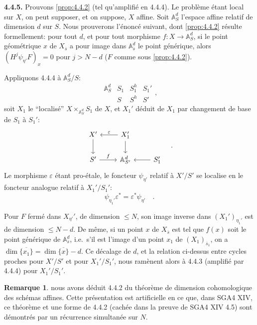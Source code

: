 \documentclass[12pt,a4paper]{article}
\theoremstyle{plain}
\theoremstyle{definition}
\newtheorem{remark}[theorem]{Remarque}
\providecommand{\comma}{,}
\begin{document}
\noindent\textbf{4.4.5.} Prouvons \ref{prop:4.4.2} (tel qu'amplifi\'{e} en 4.4.4). Le probl\`{e}me \'{e}tant local sur $X$, on peut supposer, et on suppose, $X$ affine. Soit $\mathbb{A}_{S}^{d}$ l'espace affine relatif de dimension $d$ sur $S$. Nous prouverons l'\'{e}nonc\'{e} suivant, dont \ref{prop:4.4.2} r\'{e}sulte formellement: pour tout $d$, et pour tout morphisme $f: X \to \mathbb{A}_{S}^{d}$, si le point g\'{e}om\'{e}trique $x$ de $X_{\overline{s}}$ a pour image dans $\mathbb{A}_{\overline{s}}^{d}$ le point g\'{e}n\'{e}rique, alors $(H^{j}\psi_{\eta'}F)_{x} = 0$ pour $j > N-d$ ($F$ comme sous \ref{prop:4.4.2}).

Appliquons 4.4.4 \`{a} $\mathbb{A}_{S}^{d}/S$:
\[
\begin{array}{cccc}
\mathbb{A}_{S}^{d} & S_{1} & S_{1}^{h} & S_{1}' \\
& S & S^{h} & S'
\end{array}
\comma
\]
soit $X_{1}$ le ``localis\'{e}'' $X \times_{\mathbb{A}_{S}^{d}} S_{1}$ de $X$, et $X_{1}'$ d\'{e}duit de $X_{1}$ par changement de base de $S_{1}$ \`{a} $S_{1}'$:
\[
\begin{tikzcd}
X' \dar & X_{1}' \lar[']{\varepsilon} \dar \\
S' \rar{f} & \mathbb{A}_{S'}^{d} & S_{1}' \lar
\end{tikzcd}
\quad.
\]
Le morphisme $\varepsilon$ \'{e}tant pro-\'{e}tale, le foncteur $\psi_{\eta'}$ relatif \`{a} $X'/S'$ se localise en le foncteur analogue relatif \`{a} $X_{1}'/S_{1}'$:
\[
\psi_{\eta_{1}'} \varepsilon^{*} = \varepsilon^{*} \psi_{\eta'}\quad.
\]


Pour $F$ ferm\'{e} dans $X_{\eta'}'$, de dimension $\leq N$, son image inverse dans $(X_{1}')_{\eta_{1}'}$ est de dimension $\leq N-d$. De m\^{e}me, si un point $x$ de $X_{\overline{s}}$ est tel que $f(x)$ soit le point g\'{e}n\'{e}rique de $\mathbb{A}_{\overline{s}}^{d}$, i.e.\ s'il est l'image d'un point $x_{1}$ de $(X_{1})_{\overline{s}_{1}}$, on a $\dim\overline{\{x_{1}\}} = \dim\overline{\{x\}} - d$. Ce d\'{e}calage de $d$, et la relation ci-dessus entre cycles proches pour $X'/S'$ et pour $X_{1}'/S_{1}'$, nous ram\`{e}nent alors \`{a} 4.4.3 (amplifi\'{e} par 4.4.4) pour $X_{1}'/S_{1}'$.

\begin{remark}\label{rem:4.4.5}
nous avons d\'{e}duit 4.4.2 du th\'{e}or\`{e}me de dimension cohomologique des sch\'{e}mas affines. Cette pr\'{e}sentation est artificielle en ce que, dans SGA4 XIV, ce th\'{e}or\`{e}me et une forme de 4.4.2 (cach\'{e}e dans la preuve de SGA4 XIV 4.5) sont d\'{e}montr\'{e}s par un r\'{e}currence simultan\'{e}e sur $N$.
\end{remark}
\end{document}
